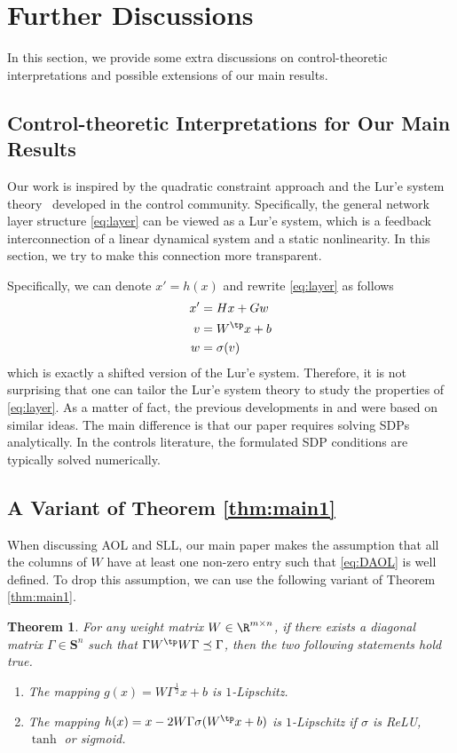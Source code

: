 \documentclass{article} \usepackage{iclr2023_conference,times}
\newcommand{\SC}{\mathbf{S}}
\newtheorem{theorem}{Theorem}
\newcommand{\0}{\mathbf{0} }
\begin{document}
\section{Further Discussions}

In this section, we provide some extra discussions on control-theoretic interpretations and possible extensions of our main results. 

\subsection{Control-theoretic Interpretations for Our Main Results}

Our work is inspired by the quadratic constraint approach \citep{Megretski1997} and the Lur'e system theory~\citep{Lure1944} developed in the control community. Specifically, the general network layer structure \eqref{eq:layer} can be viewed as a Lur'e system, which is a feedback interconnection of a linear dynamical system and a static nonlinearity. In this section, we try to make this connection more transparent.

Specifically, we can denote $x'=h(x)$ and rewrite \eqref{eq:layer} as follows
\begin{align*}
x'&=Hx+Gw\\
v&=W^\tp x+b\\
w&=\sigma(v)
\end{align*}
which is exactly a shifted version of the Lur'e system. Therefore, it is not surprising that one can tailor the Lur'e system theory to study the properties of \eqref{eq:layer}. As a matter of fact, the previous developments in \cite{fazlyab2019efficient}
and \cite{revay2020lipschitz} were based on similar ideas. The main difference is that our paper requires solving SDPs analytically. In the controls literature, the formulated SDP conditions are typically solved numerically.

\subsection{A Variant of Theorem \ref{thm:main1}}

When discussing AOL and SLL, our main paper makes the assumption that  all the columns of $W$ have at least one non-zero entry such that \eqref{eq:DAOL} is well defined. To drop this assumption, we can use the following variant of Theorem \ref{thm:main1}. 

\begin{theorem}\label{thm:main6}
For any weight matrix $W\in \R^{m\times n}$, if there exists a diagonal matrix $\Gamma\in \SC^n$ such that $\Gamma W^\tp W\Gamma\preceq \Gamma$, then the two following statements hold true. 
\begin{enumerate}
  \item The mapping $g(x)=W\Gamma^{\frac{1}{2}} x+b$  is $1$-Lipschitz.
  \item The mapping $h(x)=x-2W \Gamma \sigma (W^\tp x+b)$ is $1$-Lipschitz if $\sigma$ is ReLU, $\tanh$ or sigmoid.
\end{enumerate}
\end{theorem}
\end{document}
